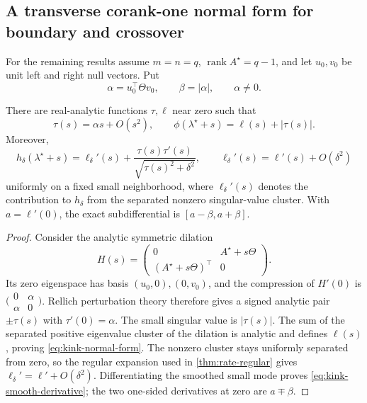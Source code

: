 \subsection{A transverse corank-one normal form for boundary and crossover}

For the remaining results assume \(m=n=q\),
\(\operatorname{rank}A^\star=q-1\), and let \(u_0,v_0\) be unit left and
right null vectors.  Put
\begin{equation}
 \alpha=u_0^\top\Theta v_0,
 \qquad \beta=|\alpha|,
 \qquad \alpha\ne0.
 \label{eq:alpha-beta-main}
\end{equation}

\begin{lemma}
\label{lem:kink-normal-form}
There are real-analytic functions \(\tau,\ell\) near zero such that
\begin{equation}
 \tau(s)=\alpha s+O(s^2),
 \qquad
 \phi(\lambda^\star+s)=\ell(s)+|\tau(s)|.
 \label{eq:kink-normal-form}
\end{equation}
Moreover,
\begin{equation}
 h_\delta(\lambda^\star+s)
 =\ell_\delta'(s)
 +\frac{\tau(s)\tau'(s)}
       {\sqrt{\tau(s)^2+\delta^2}},
 \qquad
 \ell_\delta'(s)=\ell'(s)+O(\delta^2)
 \label{eq:kink-smooth-derivative}
\end{equation}
uniformly on a fixed small neighborhood, where \(\ell_\delta'(s)\) denotes the
contribution to \(h_\delta\) from the separated nonzero singular-value cluster.
With \(a=\ell'(0)\), the exact
subdifferential is \([a-\beta,a+\beta]\).
\end{lemma}

\begin{proof}
Consider the analytic symmetric dilation
\[
 H(s)=\begin{pmatrix}
 0&A^\star+s\Theta\\
 (A^\star+s\Theta)^\top&0
 \end{pmatrix}.
\]
Its zero eigenspace has basis \((u_0,0),(0,v_0)\), and the compression of
\(H'(0)\) is
\(\bigl(\begin{smallmatrix}0&\alpha\\\alpha&0\end{smallmatrix}\bigr)\).
Rellich perturbation theory \citep[Chapter II]{kato1995perturbation} therefore
gives a signed analytic pair \(\pm\tau(s)\) with
\(\tau'(0)=\alpha\).  The small singular value is \(|\tau(s)|\).  The sum of
the separated positive eigenvalue cluster of the dilation is analytic and
defines \(\ell(s)\), proving \eqref{eq:kink-normal-form}.  The nonzero cluster
stays uniformly separated from zero, so the regular expansion used in
\cref{thm:rate-regular} gives
\(\ell_\delta'=\ell'+O(\delta^2)\).  Differentiating the smoothed small mode
proves \eqref{eq:kink-smooth-derivative}; the two one-sided derivatives at
zero are \(a\mp\beta\).
\end{proof}

